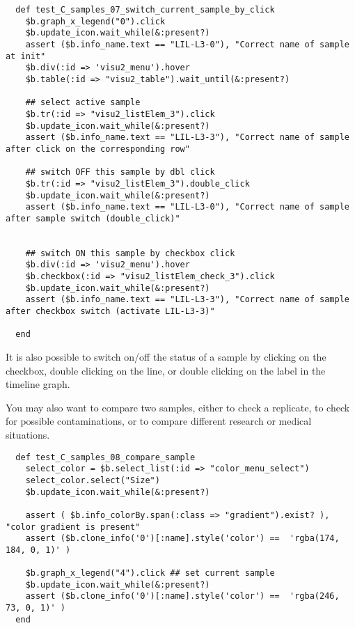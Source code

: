 \begin{verbatim}
  def test_C_samples_07_switch_current_sample_by_click
    $b.graph_x_legend("0").click
    $b.update_icon.wait_while(&:present?)
    assert ($b.info_name.text == "LIL-L3-0"), "Correct name of sample at init"
    $b.div(:id => 'visu2_menu').hover
    $b.table(:id => "visu2_table").wait_until(&:present?)

    ## select active sample
    $b.tr(:id => "visu2_listElem_3").click
    $b.update_icon.wait_while(&:present?)
    assert ($b.info_name.text == "LIL-L3-3"), "Correct name of sample after click on the corresponding row"

    ## switch OFF this sample by dbl click
    $b.tr(:id => "visu2_listElem_3").double_click
    $b.update_icon.wait_while(&:present?)
    assert ($b.info_name.text == "LIL-L3-0"), "Correct name of sample after sample switch (double_click)"
    

    ## switch ON this sample by checkbox click
    $b.div(:id => 'visu2_menu').hover
    $b.checkbox(:id => "visu2_listElem_check_3").click
    $b.update_icon.wait_while(&:present?)
    assert ($b.info_name.text == "LIL-L3-3"), "Correct name of sample after checkbox switch (activate LIL-L3-3)"
    
  end
\end{verbatim}
It is also possible to switch on/off the status of a sample by clicking on the checkbox, double clicking on the line, or double clicking on the label in the timeline graph.

\bigskip

You may also want to compare two samples, either to check a replicate, to check for possible contaminations, or to
compare different research or medical situations.

\begin{verbatim}
  def test_C_samples_08_compare_sample
    select_color = $b.select_list(:id => "color_menu_select")
    select_color.select("Size")
    $b.update_icon.wait_while(&:present?)

    assert ( $b.info_colorBy.span(:class => "gradient").exist? ), "color gradient is present"
    assert ($b.clone_info('0')[:name].style('color') ==  'rgba(174, 184, 0, 1)' )

    $b.graph_x_legend("4").click ## set current sample
    $b.update_icon.wait_while(&:present?)
    assert ($b.clone_info('0')[:name].style('color') ==  'rgba(246, 73, 0, 1)' )
  end
\end{verbatim}

